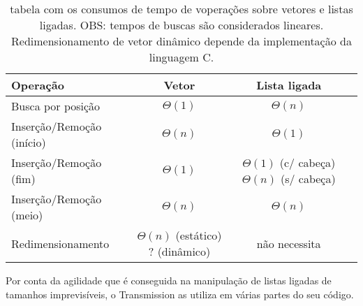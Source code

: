 \begin{table}
    \centering
    \begin{tabular}{| l | c | c | c |}
        \hline
        \textbf{Operação} & \textbf{Vetor} & \textbf{Lista ligada} \\
        \hline
        Busca por posição & $\Theta(1)$ & $\Theta(n)$ \\
        \hline
        Inserção/Remoção (início) & $\Theta(n)$ & $\Theta(1)$ \\
        \hline
        Inserção/Remoção (fim) & $\Theta(1)$ & \parbox[t]{.3\textwidth}{\centering $\Theta(1)$ (c/ cabeça) \\ $\Theta(n)$ (s/ cabeça)} \\
        \hline
        Inserção/Remoção (meio) & $\Theta(n)$ & $\Theta(n)$ \\
        \hline
        Redimensionamento & \parbox[t]{.25\textwidth}{\centering $\Theta(n)$ (estático) \\ ? (dinâmico)} & não necessita \\
        \hline
    \end{tabular}
    \caption{tabela com os consumos de tempo de voperações sobre vetores e listas
    ligadas. OBS: tempos de buscas são considerados lineares. Redimensionamento de vetor
    dinâmico depende da implementação da linguagem C.}
\end{table}

Por conta da agilidade que é conseguida na manipulação de listas ligadas de tamanhos
imprevisíveis, o Transmission as utiliza em várias partes do seu código.